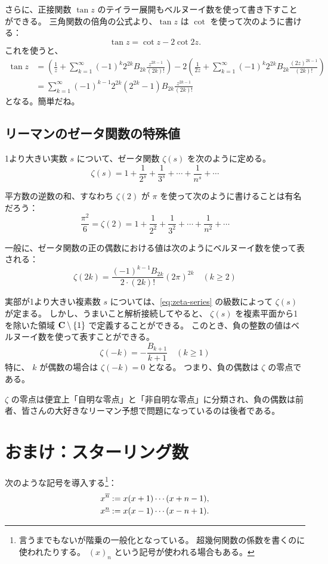 {さらに、正接関数 $\tan z$ のテイラー展開もベルヌーイ数を使って書き下すことができる。
三角関数の倍角の公式より、$\tan z$ は $\cot$ を使って次のように書ける：
\[\tan z=\cot z-2\cot 2z.\]
これを使うと、
\begin{align*}
  \tan z&=\left(\frac{1}{z}+\sum_{k=1}^\infty (-1)^k 2^{2k} B_{2k}\frac{z^{2k-1}}{(2k)!}\right)
          -2\left(\frac{1}{2z}+\sum_{k=1}^\infty (-1)^k 2^{2k} B_{2k}\frac{(2z)^{2k-1}}{(2k)!}\right) \\
        &=\sum_{k=1}^\infty (-1)^{k-1} 2^{2k} (2^{2k}-1)  B_{2k}\frac{z^{2k-1}}{(2k)!}
\end{align*}
となる。簡単だね。

\subsection{リーマンのゼータ関数の特殊値}
1より大きい実数 $s$ について、ゼータ関数 $\zeta(s)$ を次のように定める。
\begin{equation} \label{eq:zeta-series}
  \zeta(s)=1+\frac{1}{2^s}+\frac{1}{3^s}+\dotsb+\frac{1}{n^s}+\dotsb
\end{equation}

平方数の逆数の和、すなわち $\zeta(2)$ が $\pi$ を使って次のように書けることは有名だろう：
\[\frac{\pi^2}{6}=\zeta(2)=1+\frac{1}{2^2}+\frac{1}{3^2}+\dotsb+\frac{1}{n^2}+\dotsb\]

一般に、ゼータ関数の正の偶数における値は次のようにベルヌーイ数を使って表される：
\[\zeta(2k)=\frac{(-1)^{k-1}B_{2k}}{2\cdot(2k)!}(2\pi)^{2k} \quad (k\ge 2)\]

実部が1より大きい複素数 $s$ については、\autoref{eq:zeta-series} の級数によって $\zeta(s)$ が定まる。
しかし、うまいこと解析接続してやると、 $\zeta(s)$ を複素平面から1を除いた領域 $\mathbf{C}\setminus\{1\}$ で定義することができる。
このとき、負の整数の値はベルヌーイ数を使って表すことができる。
\[\zeta(-k)=-\frac{B_{k+1}}{k+1}\quad (k\ge 1)\]
特に、 $k$ が偶数の場合は $\zeta(-k)=0$ となる。
つまり、負の偶数は $\zeta$ の零点である。

$\zeta$ の零点は便宜上「自明な零点」と「非自明な零点」に分類され、負の偶数は前者、皆さんの大好きなリーマン予想で問題になっているのは後者である。

\section{おまけ：スターリング数} \label{sec:stirling-numbers}
次のような記号を導入する\footnote{%
言うまでもないが階乗の一般化となっている。
超幾何関数の係数を書くのに使われたりする。
$(x)_n$ という記号が使われる場合もある。
}：
\begin{align*}
  {x}^{\overline{n}}&:=x(x+1)\dotsb(x+n-1), \\
  {x}^{\underline{n}}&:=x(x-1)\dotsb(x-n+1).
\end{align*}

}
